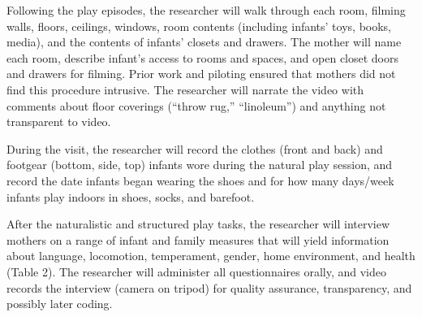 \documentclass[english,man]{apa6}
\theoremstyle{definition}
\theoremstyle{definition}
\theoremstyle{definition}
\theoremstyle{remark}
\begin{document}
Following the play episodes, the researcher will walk through each room,
filming walls, floors, ceilings, windows, room contents (including
infants' toys, books, media), and the contents of infants' closets and
drawers. The mother will name each room, describe infant's access to
rooms and spaces, and open closet doors and drawers for filming. Prior
work and piloting ensured that mothers did not find this procedure
intrusive. The researcher will narrate the video with comments about
floor coverings (\enquote{throw rug,} \enquote{linoleum}) and anything
not transparent to video.

During the visit, the researcher will record the clothes (front and
back) and footgear (bottom, side, top) infants wore during the natural
play session, and record the date infants began wearing the shoes and
for how many days/week infants play indoors in shoes, socks, and
barefoot.

After the naturalistic and structured play tasks, the researcher will
interview mothers on a range of infant and family measures that will
yield information about language, locomotion, temperament, gender, home
environment, and health (Table 2). The researcher will administer all
questionnaires orally, and video records the interview (camera on
tripod) for quality assurance, transparency, and possibly later coding.
\end{document}
